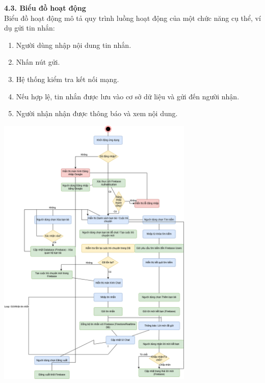 \documentclass[12pt,a4paper]{article}
\begin{document}
	\textbf{4.3. Biểu đồ hoạt động} \\
	Biểu đồ hoạt động mô tả quy trình luồng hoạt động của một chức năng cụ thể, ví dụ gửi tin nhắn:
	\begin{enumerate}
		\item Người dùng nhập nội dung tin nhắn.
		\item Nhấn nút gửi.
		\item Hệ thống kiểm tra kết nối mạng.
		\item Nếu hợp lệ, tin nhắn được lưu vào cơ sở dữ liệu và gửi đến người nhận.
		\item Người nhận nhận được thông báo và xem nội dung.
	\end{enumerate}
	\includegraphics[width=0.7\textwidth]{sodo.png}\\[0.5cm]
	
\end{document}
